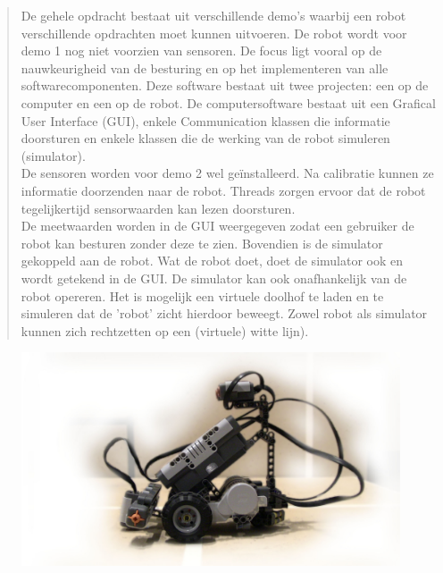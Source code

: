 \documentclass[tt3]{penoverslag}
\begin{document}

\maketitlepage

\begin{abstract}
\label{ssec:abstr} %
De gehele opdracht bestaat uit verschillende demo's waarbij een robot verschillende opdrachten moet kunnen uitvoeren. De robot wordt voor demo 1 nog niet voorzien van sensoren. De focus ligt vooral op de nauwkeurigheid van de besturing en op het implementeren van alle softwarecomponenten. Deze software bestaat uit twee projecten: een op de computer en een op de robot. De computersoftware bestaat uit een Grafical User Interface (GUI), enkele Communication klassen die informatie doorsturen en enkele klassen die de werking van de robot simuleren (simulator).\\
De sensoren worden voor demo 2 wel geïnstalleerd. Na calibratie kunnen ze informatie doorzenden naar de robot. Threads zorgen ervoor dat de robot tegelijkertijd sensorwaarden kan lezen doorsturen.\\
De meetwaarden worden in de GUI weergegeven zodat een gebruiker de robot kan besturen zonder deze te zien. Bovendien is de simulator gekoppeld aan de robot. Wat de robot doet, doet de simulator ook en wordt getekend in de GUI. De simulator kan ook onafhankelijk van de robot opereren. Het is mogelijk een virtuele doolhof te laden en te simuleren dat de 'robot' zicht hierdoor beweegt. Zowel robot als simulator kunnen zich rechtzetten op een (virtuele) witte lijn).

\end{abstract}

\tableofcontents

\begin{figure}[!hb]
\begin{flushright}
    \includegraphics[width=1\textwidth]{robotFP2}
    \label{fig:robotFP}
\end{flushright}
\end{figure}
\end{document}
